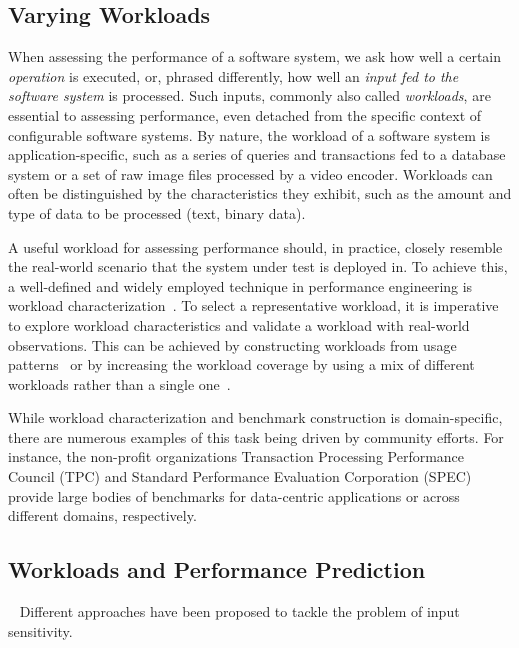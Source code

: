 {\color{black}
\subsection{Varying Workloads}\label{sec:varying_workloads}
When assessing the performance of a software system, we ask how well a certain \textit{operation} is executed, or, phrased differently, how well an \textit{input fed to the software system} is processed. Such inputs, commonly also called \textit{workloads}, are essential to assessing performance, even detached from the specific context of configurable software systems. By nature, the workload of a software system is application-specific, such as a series of queries and transactions fed to a database system or a set of raw image files processed by a video encoder. Workloads can often be distinguished by the characteristics they exhibit, such as the amount and type of data to be processed (text, binary data).

A useful workload for assessing performance should, in practice, closely resemble the real-world scenario that the system under test is deployed in. To achieve this, a well-defined and widely employed technique in performance engineering is workload characterization~\cite{ceesay2020,papadopoulos2021}. To select a representative workload, it is imperative to explore workload characteristics and validate a workload with real-world observations. This can be achieved by constructing workloads from usage patterns~\cite{calzarossa2016} or by increasing the workload coverage by using a mix of different workloads rather than a single one~\cite{jiang2015survey}.

While workload characterization and benchmark construction is domain-specific, there are numerous examples of this task being driven by community efforts. For instance, the non-profit organizations Transaction Processing Performance Council (TPC) and Standard Performance Evaluation Corporation (SPEC) provide large bodies of benchmarks for data-centric applications or across different domains, respectively.
	
\subsection{Workloads and Performance Prediction} ~\label{sec:strategies}
Different approaches have been proposed to tackle the problem of input sensitivity.

}
